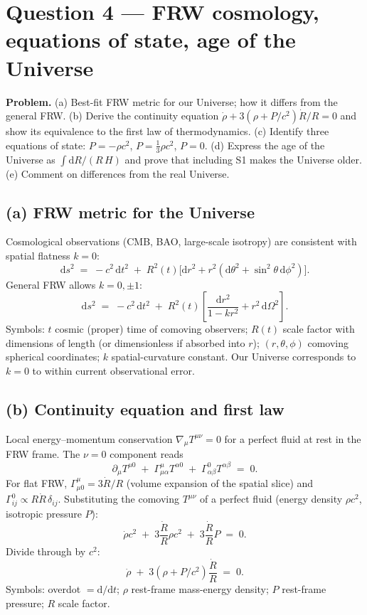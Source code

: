 \documentclass[11pt]{article}
\newcommand{\de}{\mathrm{d}}
\begin{document}
\section*{Question 4 --- FRW cosmology, equations of state, age of the Universe}

\textbf{Problem.} (a) Best-fit FRW metric for our Universe; how it differs from the general FRW. (b) Derive the continuity equation $\dot\rho+3(\rho+P/c^2)\dot R/R=0$ and show its equivalence to the first law of thermodynamics. (c) Identify three equations of state: $P=-\rho c^2$, $P=\tfrac{1}{3}\rho c^2$, $P=0$. (d) Express the age of the Universe as $\int \de R/(R\, H)$ and prove that including S1 makes the Universe older. (e) Comment on differences from the real Universe.

\subsection*{(a) FRW metric for the Universe}

Cosmological observations (CMB, BAO, large-scale isotropy) are consistent with spatial flatness $k=0$:
\begin{equation}
\boxed{\;\de s^2 \;=\; -c^2\,\de t^2 \;+\; R^2(t)\bigl[\de r^2 + r^2(\de\theta^2+\sin^2\theta\,\de\phi^2)\bigr].\;}
\label{eq:frw-ours}
\end{equation}
General FRW allows $k=0,\pm 1$:
\[
\de s^2 \;=\; -c^2\,\de t^2 \;+\; R^2(t)\!\left[\frac{\de r^2}{1-k r^2} + r^2\,\de\Omega^2\right].
\]
Symbols: $t$ cosmic (proper) time of comoving observers; $R(t)$ scale factor with dimensions of length (or dimensionless if absorbed into $r$); $(r,\theta,\phi)$ comoving spherical coordinates; $k$ spatial-curvature constant. Our Universe corresponds to $k=0$ to within current observational error.

\subsection*{(b) Continuity equation and first law}

Local energy--momentum conservation $\nabla_\mu T^{\mu\nu}=0$ for a perfect fluid at rest in the FRW frame. The $\nu=0$ component reads
\[
\partial_\mu T^{\mu 0} \;+\; \Gamma^\mu_{\mu\alpha}T^{\alpha 0} \;+\; \Gamma^0_{\alpha\beta}T^{\alpha\beta} \;=\; 0.
\]
For flat FRW, $\Gamma^\mu_{\mu 0}=3\dot R/R$ (volume expansion of the spatial slice) and $\Gamma^0_{ij}\propto R\dot R\,\delta_{ij}$. Substituting the comoving $T^{\mu\nu}$ of a perfect fluid (energy density $\rho c^2$, isotropic pressure $P$):
\[
\dot\rho c^2 \;+\; 3\frac{\dot R}{R}\rho c^2 \;+\; 3\frac{\dot R}{R}P \;=\; 0.
\]
Divide through by $c^2$:
\begin{equation}
\boxed{\;\dot\rho \;+\; 3(\rho+P/c^2)\frac{\dot R}{R} \;=\; 0.\;}
\label{eq:cont}
\end{equation}
Symbols: overdot $=\de/\de t$; $\rho$ rest-frame mass-energy density; $P$ rest-frame pressure; $R$ scale factor.
\end{document}
